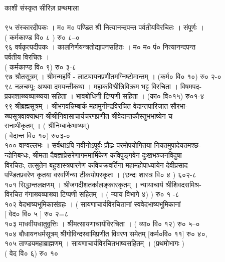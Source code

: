 \documentclass[11pt, openany]{book}
\begin{document}
{{{{{{{{{{{{{{{{{{{{{{{{{{{{{{{{{{{{{{{{{{{{{{{{{{{{{{{{{{{{{{{{{{{{{{{{{{{{{{{{{{{{{{{{{{{{{{{{{{{{{{{{{{{{{{{ काशी संस्कृत सीरिज़ प्रन्थमाला\\
~\\
९५ संस्कारदीपकः । म० म० पण्डित श्री नित्यानन्दपन्त पर्वतीयविरचितः ।
संपूर्णः ।\\
( कर्मकाण्ड वि० ८ ) रु० ८--०\\
९६ वर्षकृत्यदीपकः । कालनिर्णयन्त्रतोद्यापनसहितः । म० म० पं०
नित्यानन्दपन्त\\
पर्वतीय विरचितः ।\\
( कर्मकाण्ड वि० ९) रु० ३-८\\
९७ श्रौतसूत्रम् । श्रीमन्महर्षि - लाट्यायनप्रणीतमग्निष्टोमान्तम् ।
(कर्म० वि० १०) रु० २-०\\
९८ नलचम्पू: अथवा दमयन्तीकथा । महाकविश्रीत्रिविक्रम भट्ट विरचिता ।
विषमपद-\\
प्रकाशाख्यव्याख्यया सहिता । भावबोधिनी टिप्पणी सहिता । (का० वि०१५)
रु०१-४\\
९९ श्रीब्रह्मसूत्रम् । श्रीभगवन्निम्बार्क महामुनीन्द्रविरचित
वेदान्तपारिजात सौरभा-\\
ख्यसूत्रवाक्याथन श्रीश्रीनिवासाचार्यचरणप्रणीत श्रीवेदान्तकौस्तुभभाष्येन
च\\
सनाथीकृतम् । ( श्रीनिम्बार्कभाष्यम्)\\
( वेदान्त वि० १०) रु०३-०\\
१०० वाग्वल्लभः । सर्वथाऽपि नवीनोऽपूर्वः प्रौढः परमोपयोगितया
नियतमुपादेयतमश्छ-\\
न्दोनिबन्धः, श्रीमता दैवज्ञाप्रेसरेणागममार्मिकेण कविपुङ्गवेन
दुःखभञ्जनविदुषा\\
विरचितः, तत्सुतेन बहुशास्त्रपारगेण कविचक्रवर्तिना महामहोपाध्यायेन
देवीप्रसाद\\
पण्डितप्रवरेण कृतया वरवर्णिन्या टीकयोपस्कृतः । (छन्दः शास्त्र वि० ४ )
६०२-८\\
१०१ सिद्धान्तलक्षणम् । श्रीजगदीशतर्कालङ्कारकृतम् । न्यायाचार्य
श्रीशिवदसमिश्र-\\
विरचित गंगाख्यव्याख्या टिप्पणी सहितम् । ( न्याय विभागे ४) ) रु० १ -८\\
१०२ वेदभाष्यभूमिकासंग्रहः । ( सायणाचार्यविरचितानां
स्ववेदभाष्यभूमिकानां\\
{[} वेद० वि० ५ {]} रु० २=८\\
१०३ माधवीयधातुवृत्तिः । श्रीमत्सायणाचार्यविरचिता । ( व्या० वि० १२) रु०
५--०\\
१०४ बौधायनधर्मसूत्रम् \textbar{} श्रीगोविन्दस्वामिप्रणीत विवरण समेतम्
\textbar{} {[}कर्म०वि० ११{]} रु० ४०,\\
१०५ ताण्डयमहाब्राह्मणम् । सायणाचार्यविरचितभाष्यसहितम् । (प्रथमोभागः )\\
( वेद वि० ६) रु० १०\\
}}}}}}}}}}}}}}}}}}}}}}}}}}}}}}}}}}}}}}}}}}}}}}}}}}}}}}}}}}}}}}}}}}}}}}}}}}}}}}}}}}}}}}}}}}}}}}}}}}}}}}}}}}}}}}}
\end{document}
